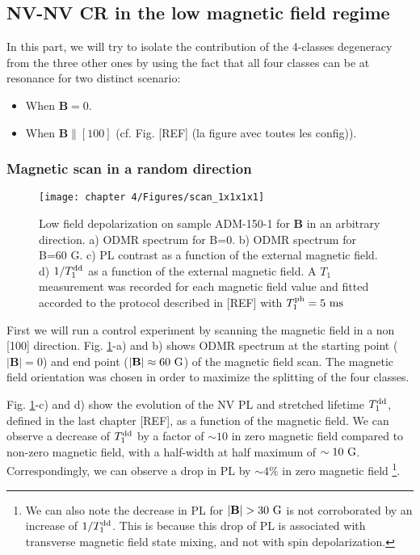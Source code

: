 \documentclass[a4paper, 11pt]{book}
\begin{document}
\subsection{NV-NV CR in the low magnetic field regime}


In this part, we will try to isolate the contribution of the 4-classes degeneracy from the three other ones by using the fact that all four classes can be at resonance for two distinct scenario:
\begin{itemize}
\item When $\mathbf{B}=0$.
\item When $\mathbf{B}\parallel [100]$ (cf. Fig. [REF] (la figure avec toutes les config)).
\end{itemize}

\subsubsection{Magnetic scan in a random direction}

\begin{figure}[h]
\centering
\texttt{[image: chapter 4/Figures/scan\_1x1x1x1]}
\caption{Low field depolarization on sample ADM-150-1 for $\mathbf{B}$ in an arbitrary direction. a) ODMR spectrum for B=0. b) ODMR spectrum for B=60 G. c) PL contrast as a function of the external magnetic field. d) $1/T_1^{\rm dd}$ as a function of the external magnetic field. A $T_1$ measurement was recorded for each magnetic field value and fitted accorded to the protocol described in [REF] with $T_1^{\rm ph}=5\ \rm ms$}
\label{scan 1x1x1x1}
\end{figure}

First we will run a control experiment by scanning the magnetic field in a non [100] direction. Fig. \ref{scan 1x1x1x1}-a) and b) shows ODMR spectrum at the starting point ($|\mathbf{B}|=0$) and end point ($|\mathbf{B}|\approx 60\ \rm G$) of the magnetic field scan. The magnetic field orientation was chosen in order to maximize the splitting of the four classes.

Fig. \ref{scan 1x1x1x1}-c) and d) show the evolution of the NV PL and stretched lifetime $T_1^{\rm dd}$, defined in the last chapter [REF], as a function of the magnetic field. We can observe a decrease of $T_1^{\rm dd}$ by a factor of $\sim 10$ in zero magnetic field compared to non-zero magnetic field, with a half-width at half maximum of $\sim 10\ \rm G$. Correspondingly, we can observe a drop in PL by $\sim 4\%$ in zero magnetic field \footnote{We can also note the decrease in PL for $|\mathbf{B}|> 30\ \rm G$ is not corroborated by an increase of $1/T_1^{\rm dd}$. This is because this drop of PL is associated with transverse magnetic field state mixing, and not with spin depolarization.}. 
\end{document}
